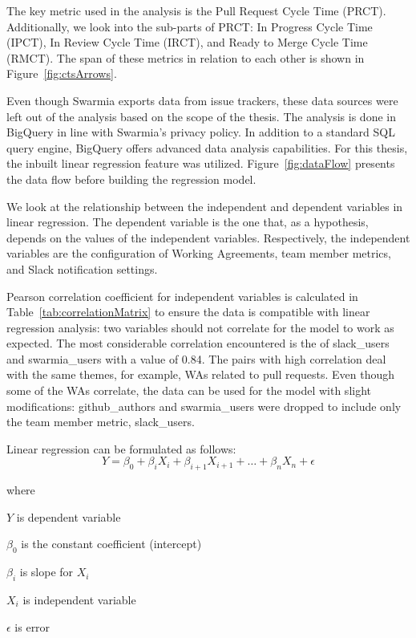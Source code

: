 The key metric used in the analysis is the Pull Request Cycle Time (PRCT). Additionally, we look into the sub-parts of PRCT: In Progress Cycle Time (IPCT), In Review Cycle Time (IRCT), and Ready to Merge Cycle Time (RMCT). The span of these metrics in relation to each other is shown in Figure~\ref{fig:ctsArrows}. 

Even though Swarmia exports data from issue trackers, these data sources were left out of the analysis based on the scope of the thesis. The analysis is done in BigQuery in line with Swarmia's privacy policy. In addition to a standard SQL query engine, BigQuery offers advanced data analysis capabilities. For this thesis, the inbuilt linear regression feature was utilized. Figure~\ref{fig:dataFlow} presents the data flow before building the regression model. 

We look at the relationship between the independent and dependent variables in linear regression. The dependent variable is the one that, as a hypothesis, depends on the values of the independent variables. Respectively, the independent variables are the configuration of Working Agreements, team member metrics, and Slack notification settings. 



Pearson correlation coefficient for independent variables is calculated in Table~\ref{tab:correlationMatrix} to ensure the data is compatible with linear regression analysis: two variables should not correlate for the model to work as expected. The most considerable correlation encountered is the of slack\_users and swarmia\_users with a value of 0.84. The pairs with high correlation deal with the same themes, for example, WAs related to pull requests. Even though some of the WAs correlate, the data can be used for the model with slight modifications: github\_authors and swarmia\_users were dropped to include only the team member metric, slack\_users. 

\begin{samepage}

Linear regression can be formulated as follows:
\begin{equation}
Y = \beta_0 + \beta_i X_i + \beta_{i+1} X_{i+1} + \ldots + \beta_n X_n + \epsilon
\end{equation}

where
\begin{description}
\item $Y$ is dependent variable
\item $\beta_0$ is the constant coefficient (intercept)
\item $\beta_i$ is slope for $X_i$
\item $X_i$ is independent variable
\item $\epsilon$ is error
\end{description}

\end{samepage}

